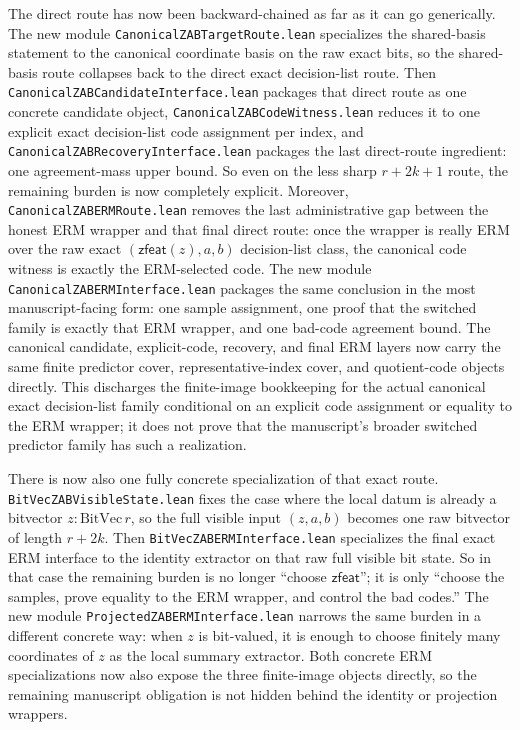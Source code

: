 \documentclass[11pt]{article}
\theoremstyle{remark}
\begin{document}
The direct route has now been backward-chained as far as it can go generically.
The new module \texttt{CanonicalZABTargetRoute.lean} specializes the
shared-basis statement to the canonical coordinate basis on the raw exact bits,
so the shared-basis route collapses back to the direct exact decision-list
route.  Then \texttt{CanonicalZABCandidateInterface.lean} packages that direct
route as one concrete candidate object, \texttt{CanonicalZABCodeWitness.lean}
reduces it to one explicit exact decision-list code assignment per index, and
\texttt{CanonicalZABRecoveryInterface.lean} packages the last direct-route
ingredient: one agreement-mass upper bound.  So even on the less sharp
\(r+2k+1\) route, the remaining burden is now completely explicit.  Moreover,
\texttt{CanonicalZABERMRoute.lean} removes the last administrative gap between
the honest ERM wrapper and that final direct route: once the wrapper is really
ERM over the raw exact \((\mathsf{zfeat}(z),a,b)\) decision-list class, the
canonical code witness is exactly the ERM-selected code.  The new module
\texttt{CanonicalZABERMInterface.lean} packages the same conclusion in the most
manuscript-facing form: one sample assignment, one proof that the switched
family is exactly that ERM wrapper, and one bad-code agreement bound.  The
canonical candidate, explicit-code, recovery, and final ERM layers now carry
the same finite predictor cover, representative-index cover, and quotient-code
objects directly.  This discharges the finite-image bookkeeping for the actual
canonical exact decision-list family conditional on an explicit code assignment
or equality to the ERM wrapper; it does not prove that the manuscript's broader
switched predictor family has such a realization.

There is now also one fully concrete specialization of that exact route.
\texttt{BitVecZABVisibleState.lean} fixes the case where the local datum is
already a bitvector \(z : \mathrm{BitVec}\, r\), so the full visible input
\((z,a,b)\) becomes one raw bitvector of length \(r+2k\).  Then
\texttt{BitVecZABERMInterface.lean} specializes the final exact ERM interface
to the identity extractor on that raw full visible bit state.  So in that
case the remaining burden is no longer “choose \(\mathsf{zfeat}\)”; it is only
“choose the samples, prove equality to the ERM wrapper, and control the bad
codes.”  The new module \texttt{ProjectedZABERMInterface.lean} narrows the same
burden in a different concrete way: when \(z\) is bit-valued, it is enough to
choose finitely many coordinates of \(z\) as the local summary extractor.
Both concrete ERM specializations now also expose the three finite-image
objects directly, so the remaining manuscript obligation is not hidden behind
the identity or projection wrappers.
\end{document}
